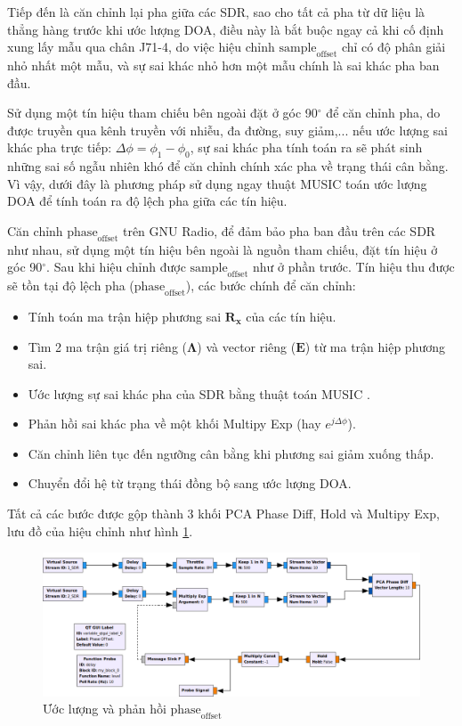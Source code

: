 Tiếp đến là căn chỉnh lại pha giữa các SDR, sao cho tất cả pha từ dữ liệu là thẳng hàng trước khi ước lượng DOA, điều này là bắt buộc ngay cả khi cố định xung lấy mẫu qua chân J71-4, do việc hiệu chỉnh $\textrm{sample}_\textrm{offset}$ chỉ có độ phân giải nhỏ nhất một mẫu, và sự sai khác nhỏ hơn một mẫu chính là sai khác pha ban đầu. 

Sử dụng một tín hiệu tham chiếu bên ngoài đặt ở góc 90$^{\circ}$ để căn chỉnh pha, do được truyền qua kênh truyền với nhiễu, đa đường, suy giảm,... nếu ước lượng sai khác pha trực tiếp: $\Delta \phi = \phi_1 - \phi_0$, sự sai khác pha tính toán ra sẽ phát sinh những sai số ngẫu nhiên khó để căn chỉnh chính xác pha về trạng thái cân bằng. Vì vậy, dưới đây là phương pháp sử dụng ngay thuật MUSIC toán ước lượng DOA để tính toán ra độ lệch pha giữa các tín hiệu.

Căn chỉnh $\textrm{phase}_\textrm{offset}$ trên GNU Radio, để đảm bảo pha ban đầu trên các SDR như nhau, sử dụng một tín hiệu bên ngoài là nguồn tham chiếu, đặt tín hiệu ở góc 90$^{\circ}$. Sau khi hiệu chỉnh được $\textrm{sample}_\textrm{offset}$ như ở  phần trước. Tín hiệu thu được sẽ tồn tại độ lệch pha ($\textrm{phase}_\textrm{offset}$), các bước chính để căn chỉnh:
\begin{itemize}
	\item Tính toán ma trận hiệp phương sai $\mathbf{R}_\mathbf{x}$ của các tín hiệu.
	\item Tìm 2 ma trận giá trị riêng ($\mathbf{\Lambda}$) và vector riêng ($\mathbf{E}$) từ ma trận hiệp phương sai.
	\item Ước lượng sự sai khác pha của SDR bằng thuật toán MUSIC \cite{Whiting2018}.
	\item Phản hồi sai khác pha về một khối Multipy Exp (hay $e^{j\Delta\phi}$).
	\item Căn chỉnh liên tục đến ngưỡng cân bằng khi phương sai giảm xuống thấp.
	\item Chuyển đổi hệ từ trạng thái đồng bộ sang ước lượng DOA.
\end{itemize}

Tất cả các bước được gộp thành 3 khối PCA Phase Diff, Hold và Multipy Exp, lưu đồ của hiệu chỉnh như hình \ref{fig:phasediff}.

\begin{figure} [!ht]
	\centering
	\includegraphics[width=1\linewidth]{figures/phasediff.png}
	\caption{Ước lượng và phản hồi $\textrm{phase}_\textrm{offset}$}
	\label{fig:phasediff}
\end{figure}

